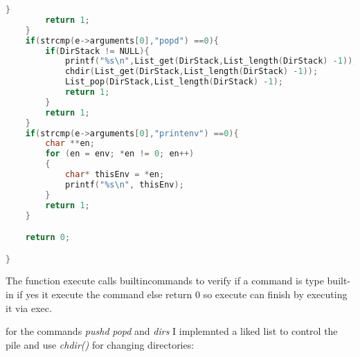\documentclass[paper=a4, fontsize=11pt]{scrartcl}
\numberwithin{equation}{section}		%
\numberwithin{figure}{section}			%
\numberwithin{table}{section}				%
\begin{document}
\begin{lstlisting}[language=c]
        }
        return 1;
    }
    if(strcmp(e->arguments[0],"popd") ==0){
        if(DirStack != NULL){ 
            printf("%s\n",List_get(DirStack,List_length(DirStack) -1));
            chdir(List_get(DirStack,List_length(DirStack) -1));
            List_pop(DirStack,List_length(DirStack) -1);
            return 1;
        }
        return 1;
    }
    if(strcmp(e->arguments[0],"printenv") ==0){
        char **en;
        for (en = env; *en != 0; en++)
        {
            char* thisEnv = *en;
            printf("%s\n", thisEnv);    
        }
        return 1;
    }

    return 0;

}
\end{lstlisting}

\pagebreak

The function execute calls builtincommands to verify if a command is type built-in if yes it execute the command else return 0 so execute can finish by executing it via exec.


for the commands \emph{pushd} \emph{popd} and \emph{dirs} I implemnted a liked list to control the pile 
and use \emph{chdir()} for changing directories:
\\
\\
\end{document}
